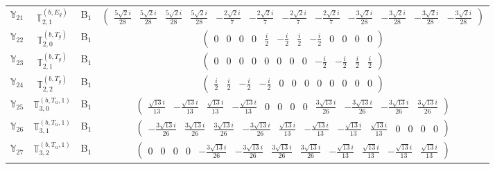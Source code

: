 \documentclass[fleqn,10pt,landscape]{article}
\begin{document}
\begin{itemize}
\begin{center}
\begin{longtable}{c|c|c|c}
$ \mathbb{Y}_{21} $ & $\mathbb{T}_{2,1}^{(b,E_{g})}$ & B$_{1}$ & $\begin{pmatrix} \frac{5 \sqrt{2} i}{28} & \frac{5 \sqrt{2} i}{28} & \frac{5 \sqrt{2} i}{28} & \frac{5 \sqrt{2} i}{28} & - \frac{2 \sqrt{2} i}{7} & - \frac{2 \sqrt{2} i}{7} & - \frac{2 \sqrt{2} i}{7} & - \frac{2 \sqrt{2} i}{7} & - \frac{3 \sqrt{2} i}{28} & - \frac{3 \sqrt{2} i}{28} & - \frac{3 \sqrt{2} i}{28} & - \frac{3 \sqrt{2} i}{28} \end{pmatrix}$ \\
$ \mathbb{Y}_{22} $ & $\mathbb{T}_{2,0}^{(b,T_{g})}$ & B$_{1}$ & $\begin{pmatrix} 0 & 0 & 0 & 0 & \frac{i}{2} & - \frac{i}{2} & \frac{i}{2} & - \frac{i}{2} & 0 & 0 & 0 & 0 \end{pmatrix}$ \\
$ \mathbb{Y}_{23} $ & $\mathbb{T}_{2,1}^{(b,T_{g})}$ & B$_{1}$ & $\begin{pmatrix} 0 & 0 & 0 & 0 & 0 & 0 & 0 & 0 & - \frac{i}{2} & - \frac{i}{2} & \frac{i}{2} & \frac{i}{2} \end{pmatrix}$ \\
$ \mathbb{Y}_{24} $ & $\mathbb{T}_{2,2}^{(b,T_{g})}$ & B$_{1}$ & $\begin{pmatrix} \frac{i}{2} & \frac{i}{2} & - \frac{i}{2} & - \frac{i}{2} & 0 & 0 & 0 & 0 & 0 & 0 & 0 & 0 \end{pmatrix}$ \\
$ \mathbb{Y}_{25} $ & $\mathbb{T}_{3,0}^{(b,T_{u},1)}$ & B$_{1}$ & $\begin{pmatrix} \frac{\sqrt{13} i}{13} & - \frac{\sqrt{13} i}{13} & \frac{\sqrt{13} i}{13} & - \frac{\sqrt{13} i}{13} & 0 & 0 & 0 & 0 & \frac{3 \sqrt{13} i}{26} & - \frac{3 \sqrt{13} i}{26} & - \frac{3 \sqrt{13} i}{26} & \frac{3 \sqrt{13} i}{26} \end{pmatrix}$ \\
$ \mathbb{Y}_{26} $ & $\mathbb{T}_{3,1}^{(b,T_{u},1)}$ & B$_{1}$ & $\begin{pmatrix} - \frac{3 \sqrt{13} i}{26} & \frac{3 \sqrt{13} i}{26} & \frac{3 \sqrt{13} i}{26} & - \frac{3 \sqrt{13} i}{26} & \frac{\sqrt{13} i}{13} & - \frac{\sqrt{13} i}{13} & - \frac{\sqrt{13} i}{13} & \frac{\sqrt{13} i}{13} & 0 & 0 & 0 & 0 \end{pmatrix}$ \\
$ \mathbb{Y}_{27} $ & $\mathbb{T}_{3,2}^{(b,T_{u},1)}$ & B$_{1}$ & $\begin{pmatrix} 0 & 0 & 0 & 0 & - \frac{3 \sqrt{13} i}{26} & - \frac{3 \sqrt{13} i}{26} & \frac{3 \sqrt{13} i}{26} & \frac{3 \sqrt{13} i}{26} & - \frac{\sqrt{13} i}{13} & \frac{\sqrt{13} i}{13} & - \frac{\sqrt{13} i}{13} & \frac{\sqrt{13} i}{13} \end{pmatrix}$ \\ \hline

\end{longtable}
\end{center}
\end{itemize}
\end{document}
